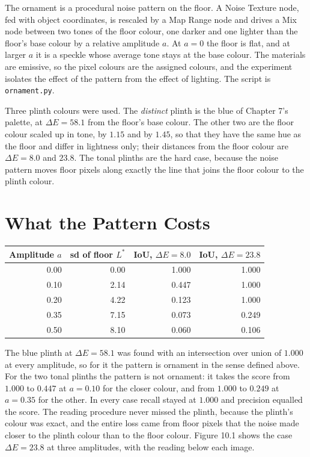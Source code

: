 The ornament is a procedural noise pattern on the floor. A Noise Texture node, fed with object coordinates, is rescaled by a Map Range node and drives a Mix node between two tones of the floor colour, one darker and one lighter than the floor's base colour by a relative amplitude $a$. At $a=0$ the floor is flat, and at larger $a$ it is a speckle whose average tone stays at the base colour. The materials are emissive, so the pixel colours are the assigned colours, and the experiment isolates the effect of the pattern from the effect of lighting. The script is \texttt{ornament.py}.

Three plinth colours were used. The \emph{distinct} plinth is the blue of Chapter 7's palette, at $\Delta E=58.1$ from the floor's base colour. The other two are the floor colour scaled up in tone, by $1.15$ and by $1.45$, so that they have the same hue as the floor and differ in lightness only; their distances from the floor colour are $\Delta E=8.0$ and $23.8$. The tonal plinths are the hard case, because the noise pattern moves floor pixels along exactly the line that joins the floor colour to the plinth colour.

\section{What the Pattern Costs}

\begin{center}
\begin{tabular}{rrrr}
\toprule
Amplitude $a$ & sd of floor $L^*$ & IoU, $\Delta E=8.0$ & IoU, $\Delta E=23.8$\\
\midrule
0.00 & 0.00 & 1.000 & 1.000\\
0.10 & 2.14 & 0.447 & 1.000\\
0.20 & 4.22 & 0.123 & 1.000\\
0.35 & 7.15 & 0.073 & 0.249\\
0.50 & 8.10 & 0.060 & 0.106\\
\bottomrule
\end{tabular}
\end{center}

The blue plinth at $\Delta E=58.1$ was found with an intersection over union of $1.000$ at every amplitude, so for it the pattern is ornament in the sense defined above. For the two tonal plinths the pattern is not ornament: it takes the score from $1.000$ to $0.447$ at $a=0.10$ for the closer colour, and from $1.000$ to $0.249$ at $a=0.35$ for the other. In every case recall stayed at $1.000$ and precision equalled the score. The reading procedure never missed the plinth, because the plinth's colour was exact, and the entire loss came from floor pixels that the noise made closer to the plinth colour than to the floor colour. Figure 10.1 shows the case $\Delta E=23.8$ at three amplitudes, with the reading below each image.


